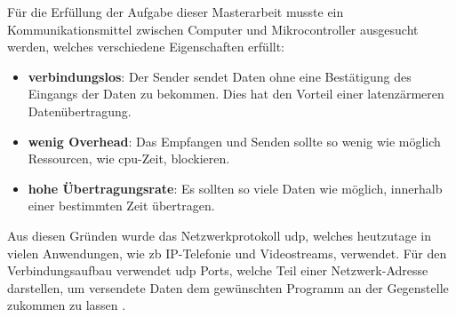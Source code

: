 \documentclass[../EDF Master Thesis.tex]{subfiles}
\begin{document}
    Für die Erfüllung der Aufgabe dieser Masterarbeit musste ein Kommunikationsmittel zwischen Computer und Mikrocontroller ausgesucht werden, welches verschiedene Eigenschaften erfüllt:
    \begin{itemize}
        \item \textbf{verbindungslos}: Der Sender sendet Daten ohne eine Bestätigung des Eingangs der Daten zu bekommen.
                                       Dies hat den Vorteil einer latenzärmeren Datenübertragung.
        \item \textbf{wenig Overhead}: Das Empfangen und Senden sollte so wenig wie möglich Ressourcen, wie \ac{cpu}-Zeit, blockieren.
        \item \textbf{hohe Übertragungsrate}: Es sollten so viele Daten wie möglich, innerhalb einer bestimmten Zeit übertragen.
    \end{itemize}

    Aus diesen Gründen wurde das Netzwerkprotokoll \ac{udp}, welches heutzutage in vielen Anwendungen, wie \ac{zb} \ac{IP}-Telefonie und Videostreams, verwendet.
    Für den Verbindungsaufbau verwendet \ac{udp} Ports, welche Teil einer Netzwerk-Adresse darstellen, um versendete Daten dem gewünschten Programm an der Gegenstelle zukommen zu lassen \parencite{wiki:009}.
\end{document}
